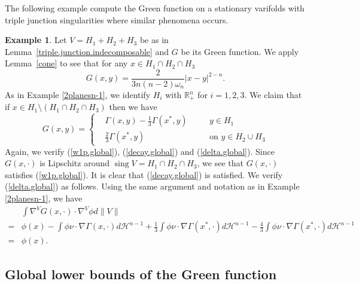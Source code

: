 \documentclass[11pt]{amsart}
\theoremstyle{definition}
\newtheorem{example}[theorem]{Example}
\newcommand{\HH}{\mathcal{H}}
\newcommand{\R}{\mathbb{R}}
\DeclareMathOperator{\sing}{sing}
\begin{document}
The following example compute the Green function on a stationary varifolds with triple junction singularities where similar phenomena occurs.
\begin{example}\label{triple.junction}
	Let $V=H_1+H_2+H_3$ be as in Lemma~\ref{triple.junction.indecomposable} and $G$ be its Green function. 
	We apply Lemma~\ref{cone} to see that for any $x\in H_1\cap H_2\cap H_3$
	\[G(x,y)=\frac{2}{3n(n-2)\omega_n}|x-y|^{2-n}.\]
	As in Example \ref{2planesn-1}, we identify $H_i$ with $ \R^n_+$ for $i=1,2,3$.
	We claim that if $x\in H_1\setminus (H_1\cap H_2\cap H_3)$ then we have
	\[G(x,y)=\left\{\begin{aligned}
		&\Gamma(x,y)-\frac{1}{3} \Gamma (x^*,y)&\quad& y\in H_1\\
		&\frac{2}{3}\Gamma(x^*,y)&\quad&\text{on }  y\in H_2\cup  H_3 
	\end{aligned}\right.\]
	Again, we verify (\ref{w1p.global}), (\ref{decay.global}) and (\ref{delta.global}). Since $G(x,\cdot)$ is Lipschitz around $\sing V=H_1\cap H_2\cap H_3$, we see that $G(x,\cdot)$ satisfies (\ref{w1p.global}). It is clear that (\ref{decay.global}) is satisfied.
	We verify (\ref{delta.global}) as follows. Using the same argument and notation as in Example \ref{2planesn-1}, we have
	\[\begin{aligned}
		&\int \nabla^V G(x,\cdot)\cdot\nabla^V \phi d\|V\|\\
		=&\phi(x)-\int \phi\nu\cdot \nabla \Gamma(x,\cdot)d\HH^{n-1}+\frac{1}{3}\int \phi\nu\cdot \nabla \Gamma(x^*,\cdot)  d\HH^{n-1}-\frac{4}{3}\int \phi\nu\cdot\nabla \Gamma(x^*,\cdot)  d\HH^{n-1}\\
		=&\phi(x).
	\end{aligned}\]
\end{example}
\subsection{Global lower bounds of the Green function}
\end{document}
